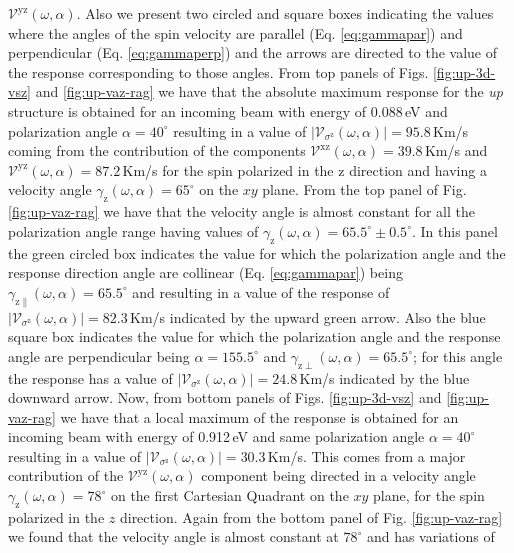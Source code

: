 \documentclass[prb,11pt,tightenlines,twocolumn,aps]{revtex4-1}
\begin{document}
$\mathcal{V}^{\mathrm{yz}}(\omega,\alpha)$. Also we present two circled and
square boxes indicating the values where the angles of the spin velocity are
parallel (Eq. \ref{eq:gammapar}) and perpendicular (Eq. \ref{eq:gammaperp}) and
the arrows are directed to the value of the response corresponding to those
angles.
% 
From top panels of Figs. \ref{fig:up-3d-vsz} and \ref{fig:up-vaz-rag} we have
that the absolute maximum response for the \emph{up} structure is obtained for
an incoming beam with energy of 0.088\,eV and polarization angle
$\alpha=40^{\circ}$ resulting in a value of
$|\mathcal{V}_{\sigma^{\mathrm{z}}}(\omega,\alpha)|=95.8$\,Km/s coming from the
contribution of the components
$\mathcal{V}^{\mathrm{xz}}(\omega,\alpha)=39.8$\,Km/s and
$\mathcal{V}^{\mathrm{yz}}(\omega,\alpha)=87.2$\,Km/s for the spin polarized in
the $\mathrm{z}$ direction and having a velocity angle
$\gamma_{\mathrm{z}}(\omega,\alpha)=65^{\circ}$ on the $xy$ plane.
% 
From the top panel of Fig. \ref{fig:up-vaz-rag} we have that the velocity angle
is almost constant for all the polarization angle range having values of
$\gamma_{\mathrm{z}}(\omega,\alpha) = 65.5^{\circ} \pm 0.5^{\circ}$. In this
panel the green circled box indicates the value for which the polarization angle
and the response direction angle are collinear (Eq. \ref{eq:gammapar}) being
$\gamma_{\mathrm{z}\parallel}(\omega,\alpha) = 65.5^{\circ}$ and resulting in a
value of the response of $|\mathcal{V}_{\sigma^{\mathrm{z}}}(\omega,\alpha)| =
82.3$\,Km/s indicated by the upward green arrow.
% 
Also the blue square box indicates the value for which the polarization angle
and the response angle are perpendicular being $\alpha=155.5^{\circ}$ and
$\gamma_{\mathrm{z}\perp}(\omega,\alpha)=65.5^{\circ}$; for this angle the
response has a value of $|\mathcal{V}_{\sigma^{\mathrm{z}}}(\omega,\alpha)| =
24.8$\,Km/s indicated by the blue downward arrow.
% 
Now, from bottom panels of Figs. \ref{fig:up-3d-vsz} and \ref{fig:up-vaz-rag} we
have that a local maximum of the response is obtained for an incoming beam with
energy of 0.912\,eV and same polarization angle $\alpha=40^{\circ}$ resulting in
a value of $|\mathcal{V}_{\sigma^{\mathrm{z}}}(\omega,\alpha)|=30.3$\,Km/s. This
comes from a major contribution of the
$\mathcal{V}^{\mathrm{yz}}(\omega,\alpha)$ component being directed in a
velocity angle $\gamma_{\mathrm{z}}(\omega,\alpha)=78^{\circ}$ on the first
Cartesian Quadrant on the $xy$ plane, for the spin polarized in the $z$
direction.
% 
Again from the bottom panel of Fig. \ref{fig:up-vaz-rag} we found that the
velocity angle is almost constant at $78^{\circ}$ and has variations of
\end{document}
